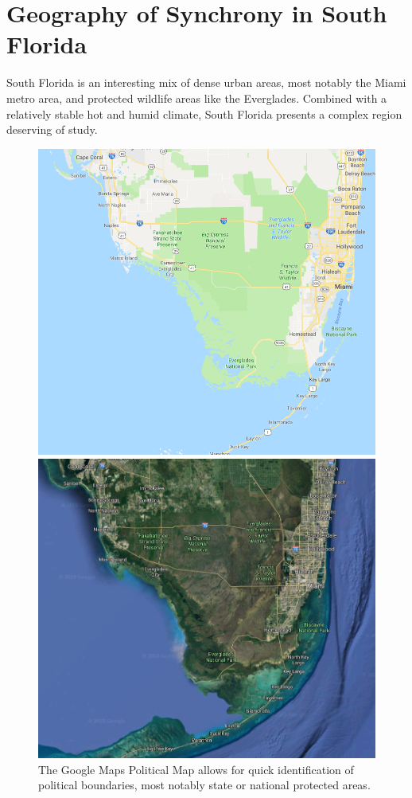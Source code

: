 \documentclass[11pt,reqno, twoside]{amsart}
\theoremstyle{plain}  %
\theoremstyle{definition}
\numberwithin{figure}{section}
\numberwithin{equation}{section}
\begin{document}
\section{Geography of Synchrony in South Florida}
South Florida is an interesting mix of dense urban areas, most notably the Miami metro area, and protected wildlife areas like the Everglades. Combined with a relatively stable hot and humid climate, South Florida presents a complex region deserving of study. 
\begin{figure}[H] 
  \label{SouthFloridaMaps} 
  \begin{minipage}[b]{0.5\linewidth}
    \centering
    \includegraphics[width=1\linewidth]{images/SouthFloridaPoliticalMap.png} 
    \caption{The Google Maps Political Map allows for quick identification of political boundaries, most notably state or national protected areas.} 
    \vspace{4ex}
  \end{minipage}%
  \begin{minipage}[b]{0.5\linewidth}
    \centering
    \includegraphics[width=1\linewidth]{images/SouthFloridaSateliteMap.png} 

\end{minipage}
\end{figure}
\end{document}
